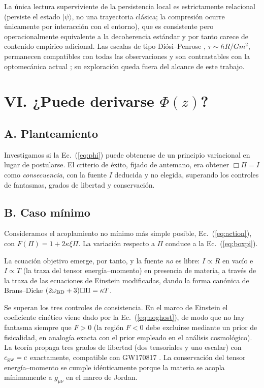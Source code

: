 \documentclass[aps,prd,twocolumn,superscriptaddress,nofootinbib,floatfix]{revtex4-2}
\begin{document}
La \'unica lectura superviviente de la persistencia local es
estrictamente relacional (persiste el estado $|\psi\rangle$, no una
trayectoria cl\'asica; la compresi\'on ocurre \'unicamente por
interacci\'on con el entorno), que es consistente pero operacionalmente
equivalente a la decoherencia est\'andar y por tanto carece de
contenido emp\'irico adicional. Las escalas de tipo Di\'osi--Penrose
\cite{Diosi1987,Penrose1996}, $\tau\sim\hbar R/Gm^2$, permanecen
compatibles con todas las observaciones y son contrastables con la
optomec\'anica actual \cite{Donadi2021}; su exploraci\'on queda fuera
del alcance de este trabajo.

\section*{VI. ¿Puede derivarse $\Phi(z)$?}

\subsection*{A. Planteamiento}

Investigamos si la Ec.~(\ref{eq:phi}) puede obtenerse de un principio
variacional en lugar de postularse. El criterio de \'exito, fijado de
antemano, era obtener $\Box\Pi=I$ como \emph{consecuencia}, con la
fuente $I$ deducida y no elegida, superando los controles de
fantasmas, grados de libertad y conservaci\'on.

\subsection*{B. Caso m\'inimo}

Consideramos el acoplamiento no m\'inimo m\'as simple posible,
Ec.~(\ref{eq:action}), con $F(\Pi)=1+2\kappa\xi\Pi$. La variaci\'on
respecto a $\Pi$ conduce a la Ec.~(\ref{eq:boxpi}).

La ecuaci\'on objetivo emerge, por tanto, y la fuente \emph{no} es
libre: $I\propto R$ en vac\'io e $I\propto T$ (la traza del tensor
energ\'ia--momento) en presencia de materia, a trav\'es de la traza de
las ecuaciones de Einstein modificadas, dando la forma can\'onica de
Brans--Dicke $(2\omega_{\rm BD}+3)\Box\Pi=\kappa T$.

Se superan los tres controles de consistencia. En el marco de Einstein
el coeficiente cin\'etico viene dado por la Ec.~(\ref{eq:noghost}), de
modo que no hay fantasma siempre que $F>0$ (la regi\'on $F<0$ debe
excluirse mediante un prior de fisicalidad, en analog\'ia exacta con el
prior empleado en el an\'alisis cosmol\'ogico). La teor\'ia propaga tres
grados de libertad (dos tensoriales y uno escalar) con
$c_{\rm gw}=c$ exactamente, compatible con GW170817 \cite{GW170817}. La
conservaci\'on del tensor energ\'ia--momento se cumple id\'enticamente
porque la materia se acopla m\'inimamente a $g_{\mu\nu}$ en el marco de
Jordan.
\end{document}

